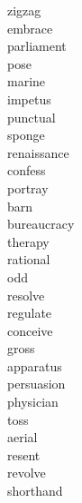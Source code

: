 \documentclass[a4paper, 11pt]{ctexart}
\begin{document}
\begin{multicols*}{3}
\begin{description}
\item[zigzag]

\item[embrace]

\item[parliament]

\item[pose]

\item[marine]

\item[impetus]

\item[punctual]

\item[sponge]

\item[renaissance]

\item[confess]

\item[portray]

\item[barn]

\item[bureaucracy]

\item[therapy]

\item[rational]

\item[odd]

\item[resolve]

\item[regulate]

\item[conceive]

\item[gross]

\item[apparatus]

\item[persuasion]

\item[physician]

\item[toss]

\item[aerial]

\item[resent]

\item[revolve]

\item[shorthand]


\end{description}
\end{multicols*}
\end{document}
